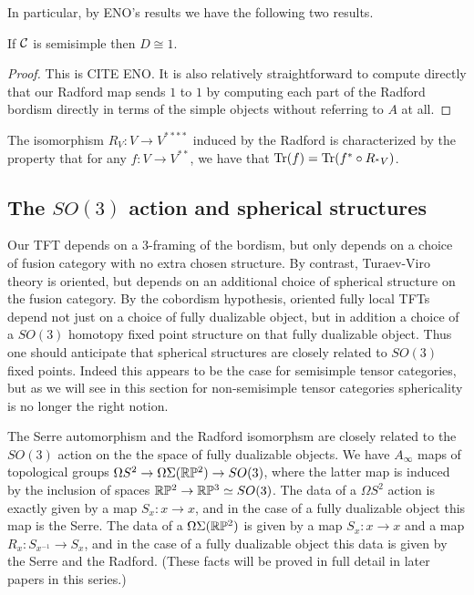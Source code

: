 \documentclass{amsart}
\begin{document}
In particular, by ENO's results we have the following two results.

\begin{lemma}
If $\mathcal C$ is semisimple then $D \cong 1$.
\end{lemma}
\begin{proof}
This is CITE ENO.  It is also relatively straightforward to compute directly that our Radford map sends $1$ to $1$ by computing each part of the Radford bordism directly in terms of the simple objects without referring to $A$ at all.
\end{proof}


\begin{lemma} \cite{???}
The isomorphism $R_V:V \rightarrow V^{****}$ induced by the Radford is characterized by the property that for any $f: V \rightarrow V^{**}$, we have that $\mathrm{Tr}(f) = \mathrm{Tr}(f^* \circ R_{{}^*V})$. 
\end{lemma}


\subsection{The $SO(3)$ action and spherical structures}

Our TFT depends on a $3$-framing of the bordism, but only depends on a choice of fusion category with no extra chosen structure.  By contrast, Turaev-Viro theory is oriented, but depends on an additional choice of spherical structure on the fusion category.  By the cobordism hypothesis, oriented fully local TFTs depend not just on a choice of fully dualizable object, but in addition a choice of a $SO(3)$ homotopy fixed point structure on that fully dualizable object.  Thus one should anticipate that spherical structures are closely related to $SO(3)$ fixed points.  Indeed this appears to be the case for semisimple tensor categories, but as we will see in this section for non-semisimple tensor categories sphericality is no longer the right notion.

The Serre automorphism and the Radford isomorphsm are closely related to the $SO(3)$ action on the the space of fully dualizable objects.  We have $A_\infty$ maps of topological groups $\Omega S^2 \rightarrow \Omega \Sigma (\mathbb R \mathbb P^2) \rightarrow SO(3)$, where the latter map is induced by the inclusion of spaces $\mathbb R \mathbb P^2 \to \mathbb R \mathbb P^3 \simeq SO(3)$.  The data of a $\Omega S^2$ action is exactly given by a map $S_x: x \rightarrow x$, and in the case of a fully dualizable object this map is the Serre.  The data of a $\Omega \Sigma (\mathbb R \mathbb P^2)$ is given by a map $S_x: x \rightarrow x$ and a map $R_x: S_{x^{-1}} \rightarrow S_x$, and in the case of a fully dualizable object this data is given by the Serre and the Radford.  (These facts will be proved in full detail in later papers in this series.)
\end{document}
